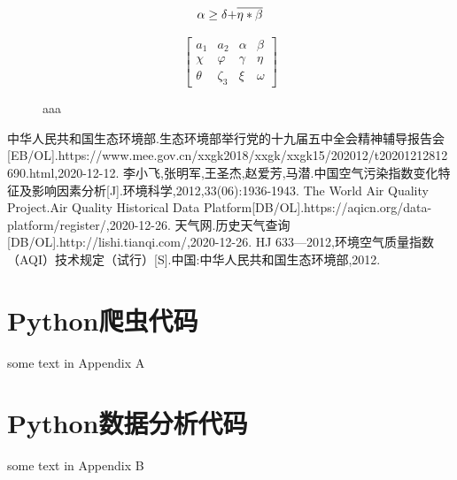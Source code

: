 \documentclass[UTF8,a4paper,10pt]{article}
\begin{document}
\begin{figure}[h]
\begin{minipage}[h]{0.48\linewidth}
\[\alpha  \ge \delta {\rm{ + }}\overline {\eta  * \beta } \]
\end{minipage}
\begin{minipage}[h]{0.48\linewidth}
\[\left[ {\begin{array}{*{20}{c}}
{{a_1}}&{{a_2}}&\alpha &\beta \\
\chi &\varphi &\gamma &\eta \\
\theta &{{\zeta _3}}&\xi &\omega
\end{array}} \right]\]
\end{minipage}
\vspace{3ex}
\caption{aaa}
\end {figure}

\small
\begin{thebibliography}{99}
    \setlength{\parskip}{0pt}  %
     中华人民共和国生态环境部.生态环境部举行党的十九届五中全会精神辅导报告会[EB/OL].https://www.mee.gov.cn/xxgk2018/xxgk/xxgk15/202012/t20201212812690.html,2020-12-12.
     李小飞,张明军,王圣杰,赵爱芳,马潜.中国空气污染指数变化特征及影响因素分析[J].环境科学,2012,33(06):1936-1943.
     The World Air Quality Project.Air Quality Historical Data Platform[DB/OL].https://aqicn.org/data-platform/register/,2020-12-26.
     天气网.历史天气查询[DB/OL].http://lishi.tianqi.com/,2020-12-26.
     HJ 633—2012,环境空气质量指数（AQI）技术规定（试行）[S].中国:中华人民共和国生态环境部,2012.

\end{thebibliography}

\begin{appendices}
    \section{Python爬虫代码}
    some text in Appendix A
    \section{Python数据分析代码}
    some text in Appendix B
 \end{appendices}

\clearpage
\end{document}
